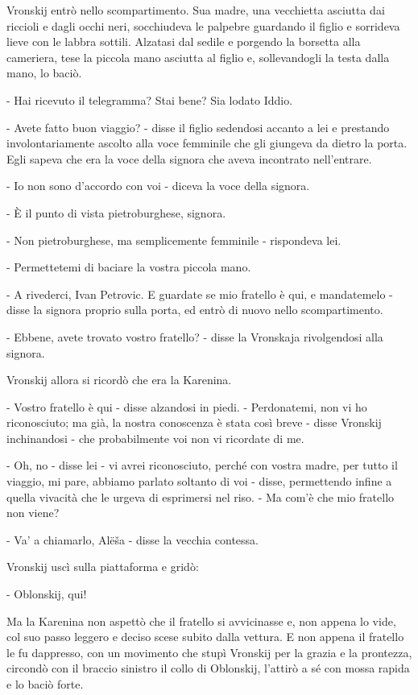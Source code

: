 Vronskij entrò nello scompartimento. Sua madre, una vecchietta asciutta dai riccioli e dagli occhi neri, socchiudeva le palpebre guardando il figlio e sorrideva lieve con le labbra sottili. Alzatasi dal sedile e porgendo la borsetta alla cameriera, tese la piccola mano asciutta al figlio e, sollevandogli la testa dalla mano, lo baciò. 

- Hai ricevuto il telegramma? Stai bene? Sia lodato Iddio. 

- Avete fatto buon viaggio? - disse il figlio sedendosi accanto a lei e prestando involontariamente ascolto alla voce femminile che gli giungeva da dietro la porta. Egli sapeva che era la voce della signora che aveva incontrato nell'entrare. 

- Io non sono d'accordo con voi - diceva la voce della signora. 

- È il punto di vista pietroburghese, signora. 

- Non pietroburghese, ma semplicemente femminile - rispondeva lei. 

- Permettetemi di baciare la vostra piccola mano. 

- A rivederci, Ivan Petrovic. E guardate se mio fratello è qui, e mandatemelo - disse la signora proprio sulla porta, ed entrò di nuovo nello scompartimento. 

- Ebbene, avete trovato vostro fratello? - disse la Vronskaja rivolgendosi alla signora. 

Vronskij allora si ricordò che era la Karenina. 

- Vostro fratello è qui - disse alzandosi in piedi. - Perdonatemi, non vi ho riconosciuto; ma già, la nostra conoscenza è stata così breve - disse Vronskij inchinandosi - che probabilmente voi non vi ricordate di me. 

- Oh, no - disse lei - vi avrei riconosciuto, perché con vostra madre, per tutto il viaggio, mi pare, abbiamo parlato soltanto di voi - disse, permettendo infine a quella vivacità che le urgeva di esprimersi nel riso. - Ma com'è che mio fratello non viene? 

- Va' a chiamarlo, Alëša - disse la vecchia contessa. 

Vronskij uscì sulla piattaforma e gridò: 

- Oblonskij, qui! 

Ma la Karenina non aspettò che il fratello si avvicinasse e, non appena lo vide, col suo passo leggero e deciso scese subito dalla vettura. E non appena il fratello le fu dappresso, con un movimento che stupì Vronskij per la grazia e la prontezza, circondò con il braccio sinistro il collo di Oblonskij, l'attirò a sé con mossa rapida e lo baciò forte. 

